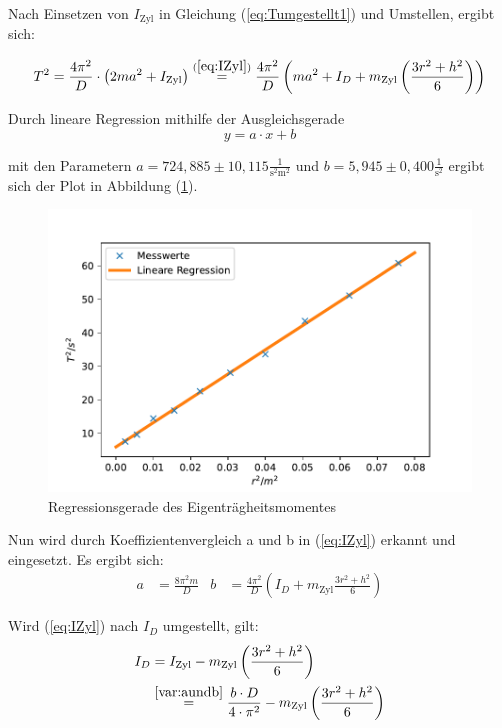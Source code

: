 Nach Einsetzen von $I_{\text{Zyl}}$ in Gleichung (\ref{eq:Tumgestellt1}) und Umstellen, ergibt sich:

\begin{equation}
  T^2 = \frac{4 \pi^2}{D} \cdot \left( 2ma^2 + I_{\text{Zyl}} \right) \stackrel{(\ref{eq:IZyl})}{=} 
  \frac{4 \pi^2}{D} \left( ma^2 + I_{D} + m_{\text{Zyl}}  \left( \frac{3 r^2 + h^2}{6} \right) \right)
\end{equation}

Durch lineare Regression mithilfe der Ausgleichsgerade 
\begin{equation*}
  y = a \cdot x + b 
\end{equation*}

mit den Parametern $a = 724,885 ± 10,115 \frac{1}{\unit{\square\second\square\meter}}$ und $b = 5,945 ± 0,400\frac{1}{\unit{\square\second}}$ ergibt sich der Plot in Abbildung (\ref{fig:Lineareregression}).

\begin{figure}[H]
  \centering
  \includegraphics{pictures/Lineare Regression.pdf}
  \caption{Regressionsgerade des Eigenträgheitsmomentes}
  \label{fig:Lineareregression}
\end{figure}

Nun wird durch Koeffizientenvergleich a und b in (\ref{eq:IZyl}) erkannt und eingesetzt.
Es ergibt sich:
\begin{align} \label{var:aundb}
  a & = \frac{8 \pi^2 m}{D} & b & = \frac{4 \pi^2}{D} \left(I_{D} + m_{\text{Zyl}} \frac{3 r^2 + h^2}{6} \right)
\end{align}

Wird (\ref{eq:IZyl}) nach $I_{D}$ umgestellt, gilt:
\begin{equation} \label{eq:idgauß}  %
  \begin{split}
  I_{D} {} &= I_{\text{Zyl}} - m_{\text{Zyl}}  \left( \frac{3 r^2 + h^2}{6} \right) \\
    &\stackrel{\ref{var:aundb}}{=} \frac{b \cdot D}{4 \cdot \pi^2} - m_{\text{Zyl}}  \left( \frac{3 r^2 + h^2}{6} \right)
  \end{split}
\end{equation}

